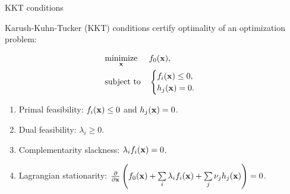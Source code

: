 \documentclass{beamer}
\begin{document}
\begin{frame}{KKT conditions}
	\begin{flushleft}
		
		Karush-Kuhn-Tucker (KKT) conditions certify optimality of an optimization problem:
		
		\begin{equation}
			\begin{aligned}
				& \underset{\mathbf{x}}{\text{minimize}}
				& & f_0(\mathbf{x}), \\
				& \text{subject to}
				& & \begin{cases}
					f_i(\mathbf{x}) \leq 0, \\
					h_j(\mathbf{x}) = 0.
				\end{cases}
			\end{aligned}
		\end{equation}
		
		\begin{enumerate}
			\item Primal feasibility: $f_i(\mathbf{x}) \leq 0$ and $h_j(\mathbf{x}) = 0$.
			
			\item Dual feasibility: $\lambda_i \geq 0$.
			
			\item Complementarity slackness: $\lambda_i f_i(\mathbf{x}) = 0$.
			
			\item Lagrangian stationarity: $\frac{\partial}{\partial \mathbf{x}} 
			\left ( f_0(\mathbf{x}) + 
			\sum\limits_i \lambda_i f_i(\mathbf{x}) +
			\sum\limits_j \nu_j h_j(\mathbf{x}) \right ) = 0$.
		\end{enumerate}
		
	\end{flushleft}
\end{frame}
\end{document}
